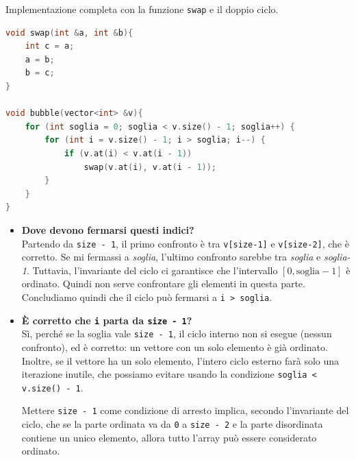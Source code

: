 \begin{codeexample}
Implementazione completa con la funzione \texttt{swap} e il doppio ciclo.

\begin{codebox}
\begin{lstlisting}[language=C++]
void swap(int &a, int &b){
    int c = a;
    a = b;
    b = c;
}

void bubble(vector<int> &v){
    for (int soglia = 0; soglia < v.size() - 1; soglia++) {
        for (int i = v.size() - 1; i > soglia; i--) {
            if (v.at(i) < v.at(i - 1))
                swap(v.at(i), v.at(i - 1));
        }
    }
}
\end{lstlisting}
\end{codebox}

\begin{itemize}
    \item \textbf{Dove devono fermarsi questi indici?}\\
    Partendo da \lstinline{size - 1}, il primo confronto \`e tra \lstinline{v[size-1]} e \lstinline{v[size-2]}, che \`e corretto. Se mi fermassi a \textit{soglia}, l'ultimo confronto sarebbe tra \textit{soglia} e \textit{soglia-1}. Tuttavia, l'invariante del ciclo ci garantisce che l'intervallo $[0, \text{soglia}-1]$ \`e ordinato. Quindi non serve confrontare gli elementi in questa parte. Concludiamo quindi che il ciclo pu\`o fermarsi a \lstinline{i > soglia}.

    \item \textbf{\`E corretto che \lstinline{i} parta da \lstinline{size - 1}?}\\
    S\`i, perch\'e se la soglia vale \lstinline{size - 1}, il ciclo interno non si esegue (nessun confronto), ed \`e corretto: un vettore con un solo elemento \`e gi\`a ordinato. Inoltre, se il vettore ha un solo elemento, l'intero ciclo esterno far\`a solo una iterazione inutile, che possiamo evitare usando la condizione \lstinline{soglia < v.size() - 1}.

    Mettere \texttt{size - 1} come condizione di arresto implica, secondo l'invariante del ciclo, che se la parte ordinata va da \texttt{0} a \texttt{size - 2} e la parte disordinata contiene un unico elemento, allora tutto l'array pu\`o essere considerato ordinato.
\end{itemize}
\end{codeexample}

